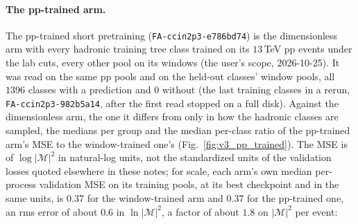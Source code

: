 \documentclass[11pt]{article}
\newcommand{\code}[1]{\texttt{#1}}
\begin{document}
\paragraph{The pp-trained arm.} The pp-trained short pretraining (\code{FA-ccin2p3-e786bd74}) is the dimensionless
arm with every hadronic training tree class trained on its $13$\,TeV pp events under the lab cuts, every other pool on
its windows (the user's scope, 2026-10-25). It was read on the same pp pools and on the held-out classes' window pools,
all $1396$ classes with a prediction and $0$ without (the last training classes in a rerun,
\code{FA-ccin2p3-982b5a14}, after the first read stopped on a full disk). Against the dimensionless arm, the one it
differs from only in how the hadronic classes are sampled, the medians per group and the median per-class ratio of the
pp-trained arm's MSE to the window-trained one's (Fig.~\ref{fig:v3_pp_trained}).
The MSE is of $\log|\mathcal M|^2$ in natural-log units, not the standardized units of the validation losses quoted
elsewhere in these notes; for scale, each arm's own median per-process validation MSE on its training pools, at its
best checkpoint and in the same units, is $0.37$ for the window-trained arm and $0.37$ for the pp-trained one, an rms
error of about $0.6$ in $\ln|\mathcal M|^2$, a factor of about $1.8$ on $|\mathcal M|^2$ per event:
\end{document}

